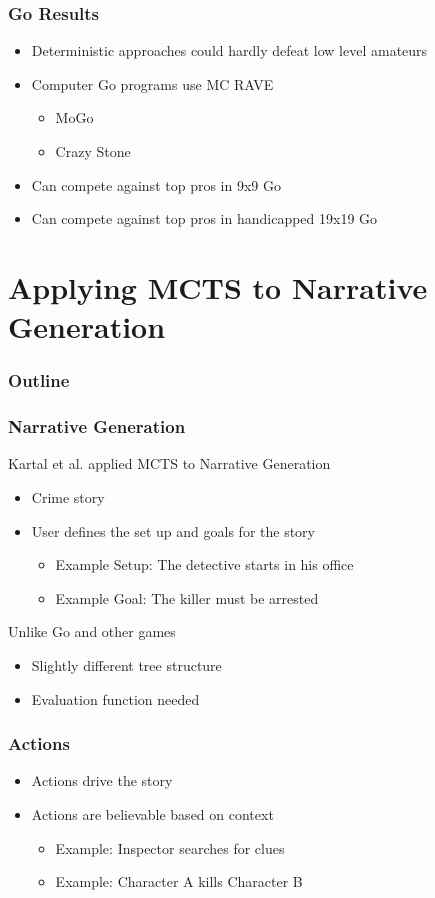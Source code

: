 \documentclass{beamer}
\begin{document}
\begin{frame}
\frametitle{Go Results}
\begin{itemize}
	\item Deterministic approaches could hardly defeat low level amateurs
	\item Computer Go programs use MC RAVE
	\begin{itemize}
		\item MoGo
		\item Crazy Stone
	\end{itemize}
	\item Can compete against top pros in 9x9 Go
	\item Can compete against top pros in handicapped 19x19 Go
\end{itemize}
\end{frame}

\section{Applying MCTS to Narrative Generation}

\begin{frame}
\frametitle{Outline}
\tableofcontents[currentsection]
\end{frame}

\begin{frame}
\frametitle{Narrative Generation}
Kartal et al. applied MCTS to Narrative Generation
\begin{itemize}
	\item Crime story
	\item User defines the set up and goals for the story
	\begin{itemize}
		\item Example Setup: The detective starts in his office
		\item Example Goal: The killer must be arrested
	\end{itemize}
\end{itemize}
Unlike Go and other games
\begin{itemize}
	\item Slightly different tree structure
	\item Evaluation function needed
\end{itemize}
\end{frame}

\begin{frame}
\frametitle{Actions}
\begin{itemize}
	\item Actions drive the story
	\item Actions are believable based on context
		\begin{itemize}
			\item Example: Inspector searches for clues
			\item Example: Character A kills Character B
		\end{itemize}
\end{itemize}
\end{frame}
\end{document}

